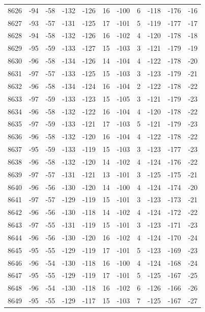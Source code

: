 \begin{table}[H]
\begin{tabular}{lllllllllll}
8626 & -94 & -58 & -132 & -126 & 16 & -100 & 6 & -118 & -176 & -16 \\
8627 & -93 & -57 & -131 & -125 & 17 & -101 & 5 & -119 & -177 & -17 \\
8628 & -94 & -58 & -132 & -126 & 16 & -102 & 4 & -120 & -178 & -18 \\
8629 & -95 & -59 & -133 & -127 & 15 & -103 & 3 & -121 & -179 & -19 \\
8630 & -96 & -58 & -134 & -126 & 14 & -104 & 4 & -122 & -178 & -20 \\
8631 & -97 & -57 & -133 & -125 & 15 & -103 & 3 & -123 & -179 & -21 \\
8632 & -96 & -58 & -134 & -124 & 16 & -104 & 2 & -122 & -178 & -22 \\
8633 & -97 & -59 & -133 & -123 & 15 & -105 & 3 & -121 & -179 & -23 \\
8634 & -96 & -58 & -132 & -122 & 16 & -104 & 4 & -120 & -178 & -22 \\
8635 & -97 & -59 & -133 & -121 & 17 & -103 & 5 & -121 & -179 & -23 \\
8636 & -96 & -58 & -132 & -120 & 16 & -104 & 4 & -122 & -178 & -22 \\
8637 & -95 & -59 & -133 & -119 & 15 & -103 & 3 & -123 & -177 & -23 \\
8638 & -96 & -58 & -132 & -120 & 14 & -102 & 4 & -124 & -176 & -22 \\
8639 & -97 & -57 & -131 & -121 & 13 & -101 & 3 & -125 & -175 & -21 \\
8640 & -96 & -56 & -130 & -120 & 14 & -100 & 4 & -124 & -174 & -20 \\
8641 & -97 & -57 & -129 & -119 & 15 & -101 & 3 & -123 & -173 & -21 \\
8642 & -96 & -56 & -130 & -118 & 14 & -102 & 4 & -124 & -172 & -22 \\
8643 & -97 & -55 & -131 & -119 & 15 & -101 & 3 & -123 & -171 & -23 \\
8644 & -96 & -56 & -130 & -120 & 16 & -102 & 4 & -124 & -170 & -24 \\
8645 & -95 & -55 & -129 & -119 & 17 & -101 & 5 & -123 & -169 & -23 \\
8646 & -96 & -54 & -130 & -118 & 16 & -100 & 4 & -124 & -168 & -24 \\
8647 & -95 & -55 & -129 & -119 & 17 & -101 & 5 & -125 & -167 & -25 \\
8648 & -96 & -54 & -130 & -118 & 16 & -102 & 6 & -126 & -166 & -26 \\
8649 & -95 & -55 & -129 & -117 & 15 & -103 & 7 & -125 & -167 & -27 \\

\end{tabular}
\end{table}
